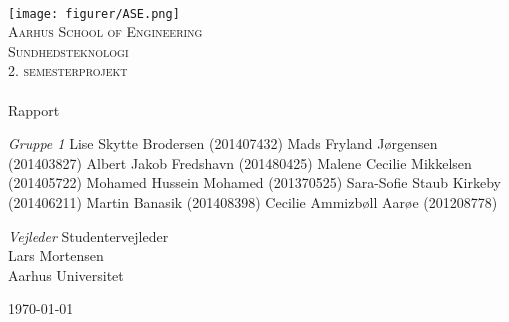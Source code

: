 \begin{titlingpage}
\begin{center}

~ \\[3cm]

\texttt{[image: figurer/ASE.png]}~\\[1cm]

\textsc{\LARGE Aarhus School of Engineering}\\[1.5cm]

\textsc{\Large Sundhedsteknologi}\\
\textsc{\Large 2. semesterprojekt}\\[0.5cm]

\noindent\makebox[\linewidth]{\rule{\textwidth}{0.4pt}}\\
[0.5cm]{\Huge Rapport}
\noindent\makebox[\linewidth]{\rule{\textwidth}{0.4pt}}

\end{center}

\textit{Gruppe 1} \newline
Lise Skytte Brodersen (201407432) \newline
Mads Fryland J\o rgensen (201403827) \newline
Albert Jakob Fredshavn (201480425) \newline
Malene Cecilie Mikkelsen (201405722) \newline		 
Mohamed Hussein Mohamed (201370525) \newline 
Sara-Sofie Staub Kirkeby (201406211) \newline
Martin Banasik (201408398) \newline
Cecilie Ammizb\o ll Aar\o e (201208778) \newline 


\textit{Vejleder} \newline
Studentervejleder\\
Lars Mortensen\\
Aarhus Universitet\\
\pageref{LastPage}



\vfill

\begin{center}
{\large \today}
\end{center}


\end{titlingpage}